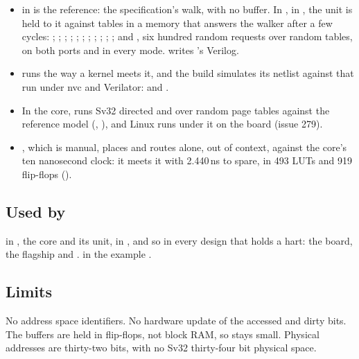 \begin{itemize}
\item {} in  is the reference: the
specification's walk, with no buffer. In , in
, the unit is held to it against tables
in a memory that answers the walker after a few cycles:
\allowbreak{}\allowbreak{};
\allowbreak{};
\allowbreak{};
\allowbreak{};
\allowbreak{}\allowbreak{}\allowbreak{};
\allowbreak{};
;
\allowbreak{};
\allowbreak{};
;
; and
\allowbreak{}, six hundred random
requests over random tables, on both ports and in every mode.
 writes 's Verilog.
\item {} runs  the way a kernel meets it, and
the build simulates its netlist against that run under nvc and
Verilator:  and
.
\item In the core,  runs Sv32
directed and over random page tables against the reference model
(\allowbreak{},
), and Linux runs under it on the
board (issue 279).
\item {}, which is manual, places and routes
 alone, out of context, against the core's ten nanosecond
clock: it meets it with 2.440\,ns to spare, in 493 LUTs and 919
flip-flops ().
\end{itemize}

\subsection*{Used by}

 in , the core and its unit, in
, and so in every design that holds a
hart: the board, the flagship and .  in the
example .

\subsection*{Limits}

No address space identifiers. No hardware update of the accessed and
dirty bits. The buffers are held in flip-flops, not block RAM, so
 stays small. Physical addresses are thirty-two bits, with no
Sv32 thirty-four bit physical space.
